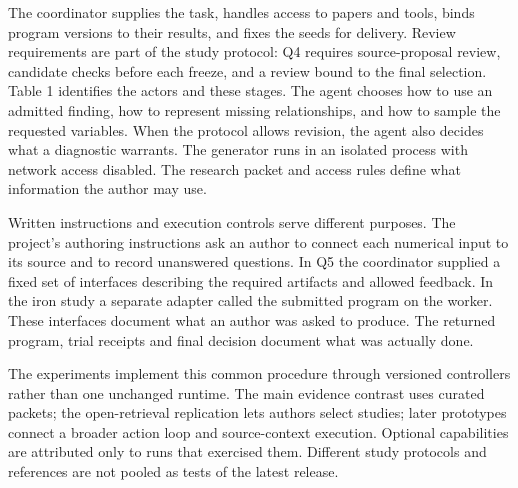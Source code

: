 \documentclass[11pt,letterpaper]{article}
\begin{document}
The coordinator supplies the task, handles access to papers and tools, binds program versions to their results, and fixes the seeds for delivery. Review requirements are part of the study protocol: Q4 requires source-proposal review, candidate checks before each freeze, and a review bound to the final selection. Table 1 identifies the actors and these stages. The agent chooses how to use an admitted finding, how to represent missing relationships, and how to sample the requested variables. When the protocol allows revision, the agent also decides what a diagnostic warrants. The generator runs in an isolated process with network access disabled. The research packet and access rules define what information the author may use.


Written instructions and execution controls serve different purposes. The project's authoring instructions ask an author to connect each numerical input to its source and to record unanswered questions. In Q5 the coordinator supplied a fixed set of interfaces describing the required artifacts and allowed feedback. In the iron study a separate adapter called the submitted program on the worker. These interfaces document what an author was asked to produce. The returned program, trial receipts and final decision document what was actually done.


The experiments implement this common procedure through versioned controllers rather than one unchanged runtime. The main evidence contrast uses curated packets; the open-retrieval replication lets authors select studies; later prototypes connect a broader action loop and source-context execution. Optional capabilities are attributed only to runs that exercised them. Different study protocols and references are not pooled as tests of the latest release.


\FloatBarrier

\begingroup

\small

\renewcommand{\arraystretch}{1.22}
\end{document}
